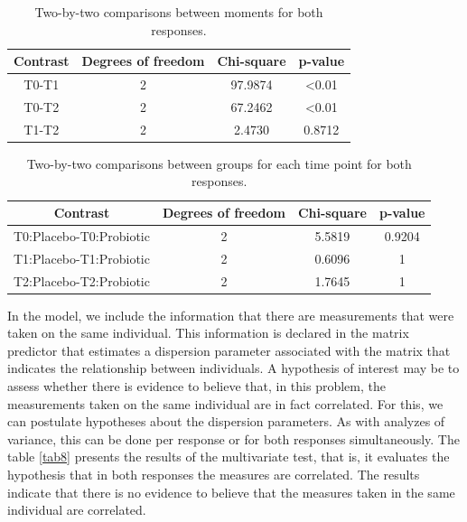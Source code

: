 \documentclass[Review,sagev,times, doublespace]{sagej}
\begin{document}
\begin{table}[h]
\centering
\begin{tabular}{cccc}
\hline
Contrast  & Degrees of freedom & Chi-square   & p-value        \\ \hline
T0-T1     & 2                  & 97.9874      & \textless 0.01 \\
T0-T2     & 2                  & 67.2462      & \textless 0.01 \\
T1-T2     & 2                  & 2.4730       & 0.8712         \\ \hline
\end{tabular}
\caption{Two-by-two comparisons between moments for both responses.}
\label{tab6}
\end{table}

\begin{table}[h]
\centering
\begin{tabular}{cccc}
\hline
Contrast                 & Degrees of freedom & Chi-square   & p-value \\ \hline
T0:Placebo-T0:Probiotic  & 2                  & 5.5819       & 0.9204  \\
T1:Placebo-T1:Probiotic  & 2                  & 0.6096       & 1       \\
T2:Placebo-T2:Probiotic  & 2                  & 1.7645       & 1       \\ \hline
\end{tabular}
\caption{Two-by-two comparisons between groups for each time point for both responses.}
\label{tab7}
\end{table}

In the model, we include the information that there are measurements that were taken on the same individual. This information is declared in the matrix predictor that estimates a dispersion parameter associated with the matrix that indicates the relationship between individuals. A hypothesis of interest may be to assess whether there is evidence to believe that, in this problem, the measurements taken on the same individual are in fact correlated. For this, we can postulate hypotheses about the dispersion parameters. As with analyzes of variance, this can be done per response or for both responses simultaneously. The table \autoref{tab8} presents the results of the multivariate test, that is, it evaluates the hypothesis that in both responses the measures are correlated. The results indicate that there is no evidence to believe that the measures taken in the same individual are correlated.
\end{document}
